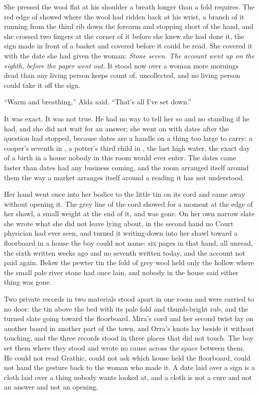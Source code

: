 She pressed the wool flat at his shoulder a breath longer than a fold requires. The red edge of  showed where the wool had ridden back at his wrist, a branch of it running from the third rib down the forearm and stopping short of the hand, and she crossed two fingers at the corner of it before she knew she had done it, the sign made in front of a basket and covered before it could be read. She covered it with the date she had given the woman: \emph{Stone seven. The account went up on the eighth, before the paper went out.} It stood now over a woman more mornings dead than any living person keeps count of, uncollected, and no living person could take it off the sign.

“Warm and breathing,” Alda said. “That's all I've set down.”

It was exact. It was not true. He had no way to tell her so and no standing if he had, and she did not wait for an answer; she went on with dates after the question had stopped, because dates are a handle on a thing too large to carry: a cooper's seventh in , a potter's third child in , the last high water, the exact day of a birth in a house nobody in this room would ever enter. The dates came faster than dates had any business coming, and the room arranged itself around them the way a market arranges itself around a reading it has not understood.

Her hand went once into her bodice to the little tin on its cord and came away without opening it. The grey line of the cord showed for a moment at the edge of her shawl, a small weight at the end of it, and was gone. On her own narrow slate she wrote what she did not leave lying about, in the second hand no Court physician had ever seen, and turned it writing-down into her shawl toward a floorboard in a house the boy could not name: six pages in that hand, all unread, the sixth written weeks ago and no seventh written today, and the account not paid again. Below the pewter tin the fold of grey wool held only the hollow where the small pale river stone had once lain, and nobody in the house said either thing was gone.

Two private records in two materials stood apart in one room and were carried to no door: the tin above the bed with its pale fold and thumb-bright rub, and the turned slate going toward the floorboard. Mira's cord and her second twist lay on another board in another part of the town, and Orra's knots lay beside it without touching, and the three records stood in three places that did not touch. The boy set them where they stood and wrote no cause across the space between them. He could not read Grathic, could not ask which house held the floorboard, could not hand the gesture back to the woman who made it. A date laid over a sign is a cloth laid over a thing nobody wants looked at, and a cloth is not a cure and not an answer and not an opening.


